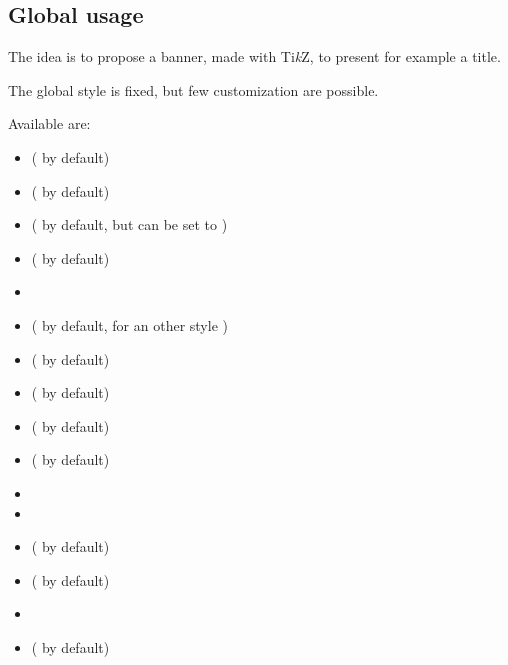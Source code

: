\documentclass[english,11pt,a4paper]{article}
\providecommand\tikzlogo{Ti\textit{k}Z}
\let\TikZ\tikzlogo
\begin{document}
\subsection{Global usage}

The idea is to propose a banner, made with \TikZ, to present for example a title.

The global style is fixed, but few customization are possible.

\begin{codehigh}[language=latex/latex3,style/main=teal!25,style/code=teal!25]
\end{codehigh}

\begin{demohigh}[language=latex/latex3,style/main=teal!25,style/code=teal!25]
\end{demohigh}

Available  are:

\begin{itemize}
	\item {} (\MontreCode{2.5em} by default)
	\item {} ( by default)
	\item {} (\MontreCode{2.75em} by default, but can be set to )
	\item {} ( by default)
	\item {}
	\item {} ( by default, for an other style )
	\item {} ( by default)
	\item {} ( by default)
	\item {} ( by default)
	\item {} ( by default)
	\item {}
	\item {}
	\item {} ( by default)
	\item {} (  by default)
	\item {}
	\item {} ( by default)
\end{itemize}
\end{document}
